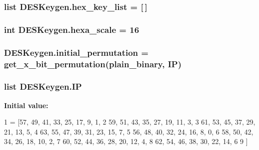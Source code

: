 \subsubsection[{\texorpdfstring{hex\+\_\+key\+\_\+list}{hex_key_list}}]{\setlength{\rightskip}{0pt plus 5cm}list D\+E\+S\+Keygen.\+hex\+\_\+key\+\_\+list = \mbox{[}$\,$\mbox{]}}\hypertarget{namespaceDESKeygen_ad0f1d71e576a17dbeba9f85fe469829a}{}\label{namespaceDESKeygen_ad0f1d71e576a17dbeba9f85fe469829a}
\subsubsection[{\texorpdfstring{hexa\+\_\+scale}{hexa_scale}}]{\setlength{\rightskip}{0pt plus 5cm}int D\+E\+S\+Keygen.\+hexa\+\_\+scale = 16}\hypertarget{namespaceDESKeygen_ac3b4d157f3aa8ee5cf421bc8f39f0442}{}\label{namespaceDESKeygen_ac3b4d157f3aa8ee5cf421bc8f39f0442}
\subsubsection[{\texorpdfstring{initial\+\_\+permutation}{initial_permutation}}]{\setlength{\rightskip}{0pt plus 5cm}D\+E\+S\+Keygen.\+initial\+\_\+permutation = {\bf get\+\_\+x\+\_\+bit\+\_\+permutation}({\bf plain\+\_\+binary}, {\bf IP})}\hypertarget{namespaceDESKeygen_aeb9fe34cab63037e4276a74f8f3ffc5c}{}\label{namespaceDESKeygen_aeb9fe34cab63037e4276a74f8f3ffc5c}
\subsubsection[{\texorpdfstring{IP}{IP}}]{\setlength{\rightskip}{0pt plus 5cm}list D\+E\+S\+Keygen.\+IP}\hypertarget{namespaceDESKeygen_a6ccc6c2aae713404c9ba45ca7959a85c}{}\label{namespaceDESKeygen_a6ccc6c2aae713404c9ba45ca7959a85c}
{\bfseries Initial value\+:}
\begin{DoxyCode}
1 = [57, 49, 41, 33, 25, 17, 9, 1,
2       59, 51, 43, 35, 27, 19, 11, 3,
3       61, 53, 45, 37, 29, 21, 13, 5,
4       63, 55, 47, 39, 31, 23, 15, 7,
5       56, 48, 40, 32, 24, 16, 8, 0,
6       58, 50, 42, 34, 26, 18, 10, 2,
7       60, 52, 44, 36, 28, 20, 12, 4,
8       62, 54, 46, 38, 30, 22, 14, 6
9       ]
\end{DoxyCode}


